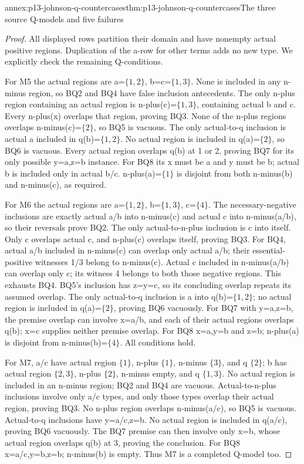 \begin{annexitem}{annex:p13-johnson-q-countercases}{thm:p13-johnson-q-countercases}{The three source Q-models and five failures}
\begin{proof}
All displayed rows partition their domain and have nonempty actual positive
regions. Duplication of the a-row for other terms adds no new type.
We explicitly check the remaining Q-conditions.

For M5 the actual regions are a=\(\{1,2\}\), b=c=\(\{1,3\}\).
None is included in any n-minus region, so BQ2 and BQ4 have false
inclusion antecedents. The only n-plus region containing an actual region
is n-plus(c)=\(\{1,3\}\), containing actual b and c. Every n-plus(x)
overlaps that region, proving BQ3. None of the n-plus regions overlaps
n-minus(c)=\(\{2\}\), so BQ5 is vacuous. The only actual-to-q inclusion
is actual a included in q(b)=\(\{1,2\}\). No actual region is included
in q(a)=\(\{2\}\), so BQ6 is vacuous. Every actual region overlaps
q(b) at 1 or 2, proving BQ7 for its only possible y=a,z=b instance.
For BQ8 its x must be a and y must be b; actual b is included only
in actual b/c. n-plus(a)=\(\{1\}\) is disjoint from both n-minus(b)
and n-minus(c), as required.

For M6 the actual regions are a=\(\{1,2\}\), b=\(\{1,3\}\), c=\(\{4\}\).
The necessary-negative inclusions are exactly actual a/b into n-minus(c)
and actual c into n-minus(a/b), so their reversals prove BQ2.
The only actual-to-n-plus inclusion is c into itself. Only c overlaps
actual c, and n-plus(c) overlaps itself, proving BQ3.
For BQ4, actual a/b included in n-minus(c) can overlap only actual
a/b; their essential-positive witnesses 1/3 belong to n-minus(c).
Actual c included in n-minus(a/b) can overlap only c; its witness 4
belongs to both those negative regions. This exhausts BQ4. BQ5's
inclusion has z=y=c, so its concluding overlap repeats its assumed
overlap. The only actual-to-q inclusion is a into q(b)=\(\{1,2\}\);
no actual region is included in q(a)=\(\{2\}\), proving BQ6 vacuously.
For BQ7 with y=a,z=b, the premise overlap can involve x=a/b, and
each of their actual regions overlaps q(b); x=c supplies neither
premise overlap. For BQ8 x=a,y=b and z=b; n-plus(a) is disjoint
from n-minus(b)=\(\{4\}\). All conditions hold.

For M7, a/c have actual region \(\{1\}\), n-plus \(\{1\}\),
n-minus \(\{3\}\), and q \(\{2\}\); b has actual region \(\{2,3\}\),
n-plus \(\{2\}\), n-minus empty, and q \(\{1,3\}\).
No actual region is included in an n-minus region; BQ2 and BQ4
are vacuous. Actual-to-n-plus inclusions involve only a/c types, and
only those types overlap their actual region, proving BQ3. No n-plus
region overlaps n-minus(a/c), so BQ5 is vacuous. Actual-to-q inclusions
have y=a/c,z=b. No actual region is included in q(a/c), proving BQ6
vacuously. The BQ7 premise can then involve only x=b, whose actual region
overlaps q(b) at 3, proving the conclusion. For BQ8 x=a/c,y=b,z=b;
n-minus(b) is empty. Thus M7 is a completed Q-model too.


\end{proof}
\end{annexitem}
